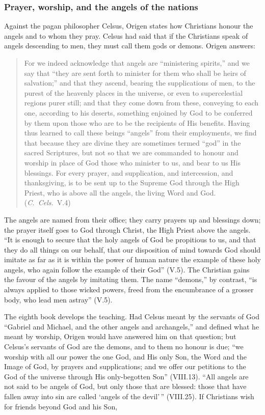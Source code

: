 \subsubsection{Prayer, worship, and the angels of the nations}

Against the pagan philosopher Celsus, Origen states how Christians honour
the angels and to whom they pray. Celsus had said that if the Christians
speak of angels descending to men, they must call them gods or demons.
Origen answers:

\begin{quote}
For we indeed acknowledge that angels are ``ministering spirits,'' and we
say that ``they are sent forth to minister for them who shall be heirs of
salvation;'' and that they ascend, bearing the supplications of men, to the
purest of the heavenly places in the universe, or even to supercelestial
regions purer still; and that they come down from these, conveying to each
one, according to his deserts, something enjoined by God to be conferred by
them upon those who are to be the recipients of His benefits. Having thus
learned to call these beings ``angels'' from their employments, we find
that because they are divine they are sometimes termed ``god'' in the
sacred Scriptures, but not so that we are commanded to honour and worship
in place of God those who minister to us, and bear to us His blessings.
For every prayer, and supplication, and intercession, and thanksgiving, is
to be sent up to the Supreme God through the High Priest, who is above all
the angels, the living Word and God. (\emph{C.\ Cels.}\ V.4)
\end{quote}

\noindent The angels are named from their office; they carry prayers up and
blessings down; the prayer itself goes to God through Christ, the High
Priest above the angels. ``It is enough to secure that the holy angels of
God be propitious to us, and that they do all things on our behalf, that
our disposition of mind towards God should imitate as far as it is within
the power of human nature the example of these holy angels, who again
follow the example of their God'' (V.5). The Christian gains the favour of
the angels by imitating them. The name ``demons,'' by contrast, ``is always
applied to those wicked powers, freed from the encumbrance of a grosser
body, who lead men astray'' (V.5).

The eighth book develops the teaching. Had Celsus meant by the servants
of God ``Gabriel and Michael, and the other angels and archangels,'' and
defined what he meant by worship, Origen would have answered him on that
question; but Celsus's servants of God are the demons, and to them no
honour is due; ``we worship with all our
power the one God, and His only Son, the Word and the Image of God, by
prayers and supplications; and we offer our petitions to the God of the
universe through His only-begotten Son'' (VIII.13). ``All angels are not
said to be angels of God, but only those that are blessed: those that have
fallen away into sin are called `angels of the devil'\,'' (VIII.25). If
Christians wish for friends beyond God and his Son,

